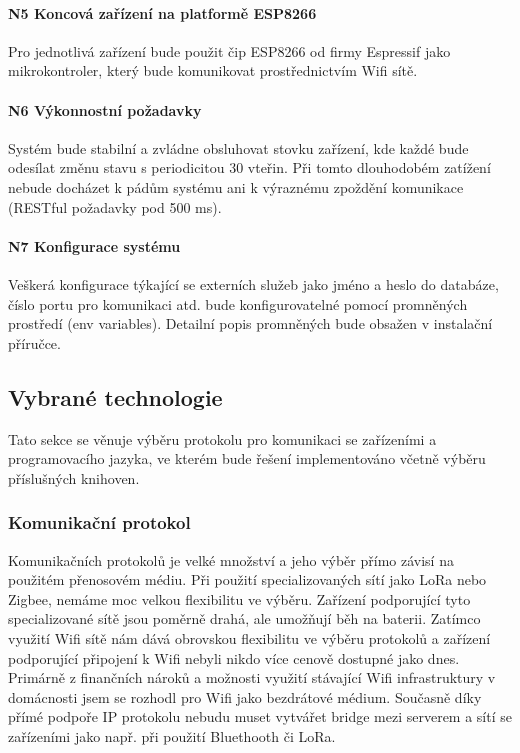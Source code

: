 \paragraph{N5 Koncová zařízení na platformě ESP8266}
Pro jednotlivá zařízení bude použit čip ESP8266 od firmy Espressif jako mikrokontroler, který bude komunikovat prostřednictvím Wifi sítě.

\paragraph{N6 Výkonnostní požadavky}
Systém bude stabilní a zvládne obsluhovat stovku zařízení, kde každé bude odesílat změnu stavu s periodicitou 30 vteřin. Při tomto dlouhodobém zatížení nebude docházet k pádům systému ani k výraznému zpoždění komunikace (RESTful požadavky pod 500 ms).

\paragraph{N7 Konfigurace systému}
Veškerá konfigurace týkající se externích služeb jako jméno a heslo do databáze, číslo portu pro komunikaci atd. bude konfigurovatelné pomocí promněných prostředí (env variables). Detailní popis promněných bude obsažen v instalační příručce.


\subsection{Vybrané technologie}
Tato sekce se věnuje výběru protokolu pro komunikaci se zařízeními a programovacího jazyka, ve kterém bude řešení implementováno včetně výběru příslušných knihoven.

\subsubsection{Komunikační protokol}   %
Komunikačních protokolů je velké množství a jeho výběr přímo závisí na použitém přenosovém médiu. Při použití specializovaných sítí jako LoRa nebo Zigbee, nemáme moc velkou flexibilitu ve výběru. Zařízení podporující tyto specializované sítě jsou poměrně drahá, ale umožňují běh na baterii. Zatímco využití Wifi sítě nám dává obrovskou flexibilitu ve výběru protokolů a zařízení podporující připojení k Wifi nebyli nikdo více cenově dostupné jako dnes. Primárně z finančních nároků a možnosti využití stávající Wifi infrastruktury v domácnosti jsem se rozhodl pro Wifi jako bezdrátové médium. Současně díky přímé podpoře IP protokolu nebudu muset vytvářet bridge mezi serverem a sítí se zařízeními jako např. při použití Bluethooth či LoRa.


